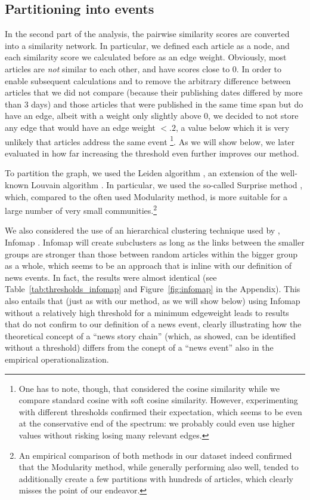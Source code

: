 \documentclass[a4paper,man,natbib,floatsintext,mask]{apa6}
\begin{document}
\subsection{Partitioning into events}
In the second part of the analysis, the pairwise similarity scores are converted into a similarity network. 
In particular, we defined each article as a node, and each similarity score we calculated before as an edge weight.
Obviously, most articles are \emph{not} similar to each other, and have scores close to 0.
In order to enable subsequent calculations and to remove the arbitrary difference between articles that we did not compare (because their publishing dates differed by more than 3 days) and those articles that were published in the same time span but do have an edge, albeit with a weight only slightly above 0, we decided to not store any edge that would have an edge weight $<.2$, a value below which it is very unlikely that articles address the same event \citep{Welbers2016}\footnote{One has to note, though, that \cite{Welbers2016} considered the cosine similarity while we compare standard cosine with soft cosine similarity. However, experimenting with different thresholds confirmed their expectation, which seems to be even at the conservative end of the spectrum: we probably could even use higher values without risking losing many relevant edges.}. As we will show below, we later evaluated in how far increasing the threshold even further improves our method.


To partition the graph, we used the Leiden algorithm \citep{Traag2019}, an extension of the well-known Louvain algorithm \citep{Blondel2008}. In particular, we used the so-called Surprise method \citep{Traag2015}, which, compared to the often used Modularity method, is more suitable for a large number of very small communities.\footnote{An empirical comparison of both methods in our dataset indeed confirmed that the Modularity method, while generally performing also well, tended to additionally create a few partitions with hundreds of articles, which clearly misses the point of our endeavor.}


We also considered the use of an hierarchical clustering technique used by \citet{Nicholls2018}, Infomap \citep{infomap}.
Infomap will create subclusters as long as the links between the smaller groups are stronger than those between random articles within the bigger group as a whole, which seems to be an approach that is inline with our definition of news events. 
In fact, the results were almost identical (see Table~\ref{tab:thresholds_infomap} and Figure~\ref{fig:infomap} in the Appendix).
This also entails that (just as with our method, as we will show below)
using Infomap without a relatively high threshold for a minimum edgeweight leads to results that do not confirm to our definition of a news event, clearly illustrating how the theoretical concept of a ``news story chain'' (which, as \citet{Nicholls2018} showed, can be identified without a threshold) differs from the conept of a ``news event'' also in the empirical operationalization.
\end{document}
